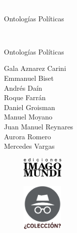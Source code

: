 \ifPDF
\PaginaEnBlanco
\PaginaEnBlanco
	\else
	\ifBNPDF
	\PaginaEnBlanco
	\PaginaEnBlanco
	\fi
\fi

\newpage
\thispagestyle{empty}
{\textcolor{white}{.}}

\vspace{30mm}

\begin{center}
	\LARGE{Ontologías Políticas}
\end{center}

\newpage
\thispagestyle{empty}
{\textcolor{white}{.}}

\newpage
\thispagestyle{empty}

\vspace{30mm}

\begin{center}
	\LARGE{Ontologías Políticas}\\\vspace{10mm}

	\Large{}
\end{center}

\vspace{10mm}

\begin{center}%
{\sc\large{Gala Aznarez Carini\\
		Emmanuel Biset\\
		Andrés Daín\\
		Roque Farrán\\
		Daniel Groisman\\
		Manuel Moyano\\
		Juan Manuel Reynares\\
		Aurora Romero\\
		Mercedes Vargas}}\\ %
\end{center}



\vfill

\begin{figure}[b]
\centering
\includegraphics[width=20mm]{./media/logo-imago-ByW.png}
\end{figure}

\newpage
\thispagestyle{empty}
\begin{figure}[t]
\centering
\vspace{-10mm}
\includegraphics[width=20mm]{./media/desconocido.png}\\
\end{figure}

